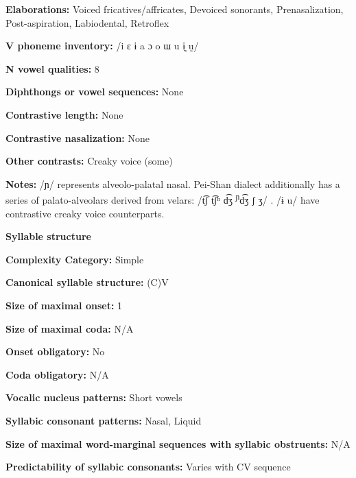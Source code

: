 \textbf{Elaborations:} Voiced fricatives/affricates, Devoiced sonorants, Prenasalization, Post-aspiration, Labiodental, Retroflex



\textbf{V phoneme inventory:} /i ɛ ɨ a ɔ o ɯ u ɨ̰ ṵ/



\textbf{N vowel qualities:} 8



\textbf{Diphthongs or vowel sequences:} None



\textbf{Contrastive length:} None



\textbf{Contrastive nasalization:} None



\textbf{Other contrasts:} Creaky voice (some)



\textbf{Notes:} /ɲ/ represents alveolo-palatal nasal. Pei-Shan dialect additionally has a series of palato-alveolars derived from velars: /t͡ʃ t͡ʃʰ d͡ʒ \textsuperscript{ɲ}d͡ʒ ʃ ʒ/ \citep[68-9]{Maoji1997}. /ɨ u/ have contrastive creaky voice counterparts.



\textbf{Syllable structure}



\textbf{Complexity Category:} Simple



\textbf{Canonical syllable structure:} (C)V \citep[30-2]{Gerner2013}



\textbf{Size of maximal onset:} 1



\textbf{Size of maximal coda:} N/A



\textbf{Onset obligatory:} No



\textbf{Coda obligatory:} N/A



\textbf{Vocalic nucleus patterns:} Short vowels



\textbf{Syllabic consonant patterns:} Nasal, Liquid



\textbf{Size of maximal word{}-marginal sequences with syllabic obstruents:} N/A



\textbf{Predictability of syllabic consonants:} Varies with CV sequence



